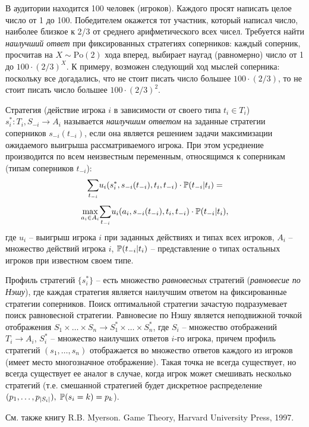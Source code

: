 \begin{problem}
В аудитории находится 100 человек (игроков). Каждого просят написать целое число от 1 до 100. Победителем окажется тот участник, который написал число, наиболее близкое к 2/3 от среднего арифметического всех чисел. Требуется найти  \textit{наилучший ответ} при фиксированных стратегиях соперников: каждый соперник, просчитав на $X \sim \mathrm{Po}(2)$  хода  вперед, выбирает наугад (равномерно) число от 1 до $100 \cdot(2/3)^X$. К примеру, возможен следующий ход мыслей соперника: поскольку все догадались, что не стоит писать число большее $100 \cdot(2/3)$, то не стоит писать число большее $100 \cdot(2/3)^2$.
\end{problem}

\begin{remark}
Стратегия (действие игрока $i$ в зависимости от своего типа $t_i \in T_i$) $s_i^*: T_i, S_{-i} \rightarrow A_i$ называется \textit{наилучшим ответом} на заданные стратегии соперников $s_{-i}(t_{-i})$, если она является решением задачи максимизации ожидаемого выигрыша рассматриваемого игрока. При этом усреднение производится по всем неизвестным переменным, относящимся к соперникам (типам соперников $t_{-i}$): 
 \[
 \underset{t_{-i}}{\sum} u_i(s_i^*, s_{-i}(t_{-i}), t_i, t_{-i}) \cdot  \mathrm{{\mathbb P}}(t_{-i} | t_i) = \]\[ \underset{a_i \in A_i}{\max} \underset{t_{-i}}{\sum} u_i(a_i, s_{-i}(t_{-i}), t_i, t_{-i}) \cdot \mathrm{{\mathbb P}}(t_{-i} | t_i), 
 \]
 \noindent где $u_i$ -- выигрыш игрока $i$  при заданных действиях и типах всех игроков, $A_i$ -- множество действий игрока $i$, $\mathrm{{\mathbb P}}(t_{-i} | t_i)$ -- представление о типах остальных игроков при известном своем типе. 
 
Профиль стратегий $\{s_i^*\}$ -- есть множество \textit{равновесных} стратегий (\textit{равновесие по Нэшу}), где каждая стратегия является наилучшим ответом на фиксированные стратегии соперников. Поиск оптимальной стратегии зачастую подразумевает поиск равновесной стратегии. Равновесие по Нэшу является неподвижной точкой отображения $S_1 \times \ldots \times S_n \rightarrow S_1^* \times \ldots \times S_n^*$, где $S_i$ -- множество отображений $T_i \rightarrow A_i$, $S_i^*$ -- множество наилучших ответов $i$-го игрока, причем профиль стратегий $(s_1, \ldots, s_n)$ отображается во множество ответов каждого из игроков (имеет место многозначное отображение). Такая точка не всегда существует, но всегда существует ее аналог в случае, когда игрок может смешивать несколько стратегий (т.е. смешанной стратегией будет дискретное распределение $(p_1,\ldots,p_{|S_i|}),\; \mathrm{{\mathbb P}}(s_i = k) = p_k$). 

См. также книгу R.B. Myerson. Game Theory, Harvard University Press, 1997. 
\end{remark}


